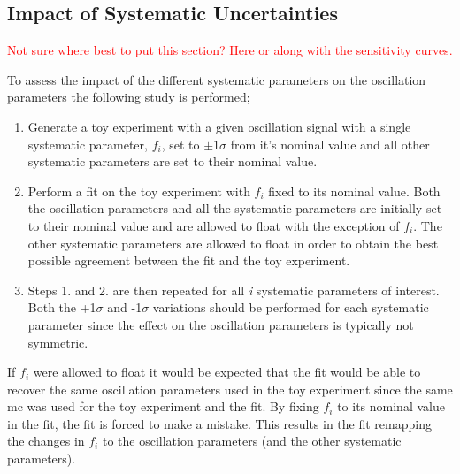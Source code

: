 \clearpage
\subsection{Impact of Systematic Uncertainties}

\textcolor{red}{Not sure where best to put this section? Here or along with the sensitivity curves.}

To assess the impact of the different systematic parameters on the oscillation parameters the following study is performed;
\begin{enumerate}
    \item Generate a toy experiment with a given oscillation signal with a single systematic parameter, $f_i$, set to $\pm1\sigma$ from it's nominal value and all other systematic parameters are set to their nominal value.
    \item Perform a fit on the toy experiment with $f_i$ fixed to its nominal value. Both the oscillation parameters and all the systematic parameters are initially set to their nominal value and are allowed to float with the exception of $f_i$. The other systematic parameters are allowed to float in order to obtain the best possible agreement between the fit and the toy experiment.
    \item Steps 1. and 2. are then repeated for all \textit{i} systematic parameters of interest. Both the +1$\sigma$ and -1$\sigma$ variations should be performed for each systematic parameter since the effect on the oscillation parameters is typically not symmetric.  
\end{enumerate}
If $f_i$ were allowed to float it would be expected that the fit would be able to recover the same oscillation parameters used in the toy experiment since the same \gls{mc} was used for the toy experiment and the fit. By fixing $f_i$ to its nominal value in the fit, the fit is forced to make a mistake. This results in the fit remapping the changes in $f_i$ to the oscillation parameters (and the other systematic parameters). 

